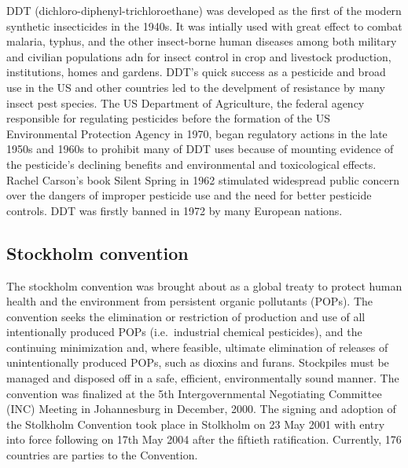 \documentclass[
  openany]{book}
\begin{document}
DDT (dichloro-diphenyl-trichloroethane) was developed as the first of the modern synthetic insecticides in the 1940s. It was intially used with great effect to combat malaria, typhus, and the other insect-borne human diseases among both military and civilian populations adn for insect control in crop and livestock production, institutions, homes and gardens. DDT's quick success as a pesticide and broad use in the US and other countries led to the develpment of resistance by many insect pest species. The US Department of Agriculture, the federal agency responsible for regulating pesticides before the formation of the US Environmental Protection Agency in 1970, began regulatory actions in the late 1950s and 1960s to prohibit many of DDT uses because of mounting evidence of the pesticide's declining benefits and environmental and toxicological effects. Rachel Carson's book Silent Spring in 1962 stimulated widespread public concern over the dangers of improper pesticide use and the need for better pesticide controls. DDT was firstly banned in 1972 by many European nations.

\hypertarget{stockholm-convention}{%
\subsection{Stockholm convention}\label{stockholm-convention}}

The stockholm convention was brought about as a global treaty to protect human health and the environment from persistent organic pollutants (POPs). The convention seeks the elimination or restriction of production and use of all intentionally produced POPs (i.e.~industrial chemical pesticides), and the continuing minimization and, where feasible, ultimate elimination of releases of unintentionally produced POPs, such as dioxins and furans. Stockpiles must be managed and disposed off in a safe, efficient, environmentally sound manner. The convention was finalized at the 5th Intergovernmental Negotiating Committee (INC) Meeting in Johannesburg in December, 2000. The signing and adoption of the Stolkholm Convention took place in Stolkholm on 23 May 2001 with entry into force following on 17th May 2004 after the fiftieth ratification. Currently, 176 countries are parties to the Convention.
\end{document}

